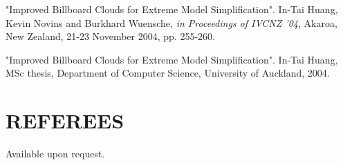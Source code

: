 \begin{resume}
\begin{minipage}{\textwidth}
"Improved Billboard Clouds for Extreme Model Simplification". In-Tai Huang, Kevin Novins and Burkhard Wuensche, \textit{in Proceedings of IVCNZ '04}, Akaroa, New Zealand, 21-23 November 2004, pp. 255-260.
\end{minipage}

"Improved Billboard Clouds for Extreme Model Simplification". In-Tai Huang, MSc thesis, Department of Computer Science, University of Auckland, 2004.

\section{REFEREES} 
\vspace{0.1in}

Available upon request.
 
\end{resume}































